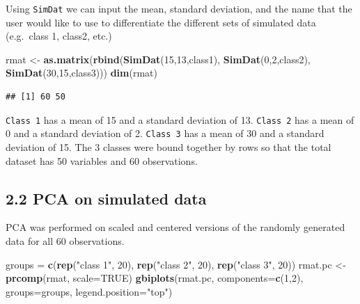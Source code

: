 \documentclass[]{article}
\newenvironment{Shaded}{\begin{snugshade}}{\end{snugshade}}
\newcommand{\KeywordTok}[1]{\textcolor[rgb]{0.13,0.29,0.53}{\textbf{{#1}}}}
\newcommand{\DataTypeTok}[1]{\textcolor[rgb]{0.13,0.29,0.53}{{#1}}}
\newcommand{\DecValTok}[1]{\textcolor[rgb]{0.00,0.00,0.81}{{#1}}}
\newcommand{\StringTok}[1]{\textcolor[rgb]{0.31,0.60,0.02}{{#1}}}
\newcommand{\OtherTok}[1]{\textcolor[rgb]{0.56,0.35,0.01}{{#1}}}
\newcommand{\NormalTok}[1]{{#1}}
\begin{document}
Using \texttt{SimDat} we can input the mean, standard deviation, and the
name that the user would like to use to differentiate the different sets
of simulated data (e.g.~class 1, class2, etc.)

\begin{Shaded}
\begin{Highlighting}[]
\NormalTok{rmat <-}\StringTok{ }\KeywordTok{as.matrix}\NormalTok{(}\KeywordTok{rbind}\NormalTok{(}\KeywordTok{SimDat}\NormalTok{(}\DecValTok{15}\NormalTok{,}\DecValTok{13}\NormalTok{,class1), }\KeywordTok{SimDat}\NormalTok{(}\DecValTok{0}\NormalTok{,}\DecValTok{2}\NormalTok{,class2), }\KeywordTok{SimDat}\NormalTok{(}\DecValTok{30}\NormalTok{,}\DecValTok{15}\NormalTok{,class3)))}
\KeywordTok{dim}\NormalTok{(rmat)}
\end{Highlighting}
\end{Shaded}

\begin{verbatim}
## [1] 60 50
\end{verbatim}

\texttt{Class 1} has a mean of 15 and a standard deviation of 13.
\texttt{Class 2} has a mean of 0 and a standard deviation of 2.
\texttt{Class 3} has a mean of 30 and a standard deviation of 15. The 3
classes were bound together by rows so that the total dataset has 50
variables and 60 observations.

\subsection{2.2 PCA on simulated data}\label{pca-on-simulated-data}

PCA was performed on scaled and centered versions of the randomly
generated data for all 60 observations.

\begin{Shaded}
\begin{Highlighting}[]
\NormalTok{groups =}\StringTok{ }\KeywordTok{c}\NormalTok{(}\KeywordTok{rep}\NormalTok{(}\StringTok{"class 1"}\NormalTok{, }\DecValTok{20}\NormalTok{), }\KeywordTok{rep}\NormalTok{(}\StringTok{"class 2"}\NormalTok{, }\DecValTok{20}\NormalTok{), }\KeywordTok{rep}\NormalTok{(}\StringTok{"class 3"}\NormalTok{, }\DecValTok{20}\NormalTok{))}
\NormalTok{rmat.pc <-}\StringTok{ }\KeywordTok{prcomp}\NormalTok{(rmat, }\DataTypeTok{scale=}\OtherTok{TRUE}\NormalTok{)}
\KeywordTok{gbiplots}\NormalTok{(rmat.pc, }\DataTypeTok{components=}\KeywordTok{c}\NormalTok{(}\DecValTok{1}\NormalTok{,}\DecValTok{2}\NormalTok{), }\DataTypeTok{groups=}\NormalTok{groups,}
         \DataTypeTok{legend.position=}\StringTok{"top"}\NormalTok{)}
\end{Highlighting}
\end{Shaded}
\end{document}
